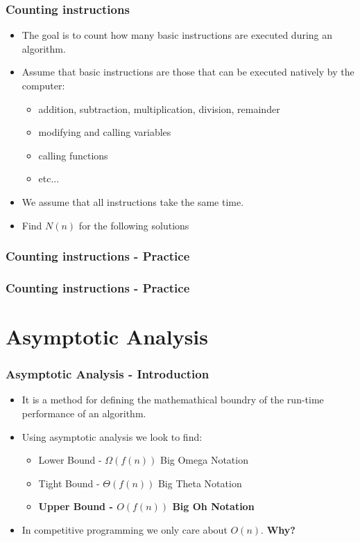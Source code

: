\documentclass{beamer}
\begin{document}
\begin{frame}
	\frametitle{Counting instructions}

	\begin{itemize}
		\item The goal is to count how many basic instructions are executed during an algorithm.
		\item Assume that basic instructions are those that can be executed natively by the computer:
			\begin{itemize}
				\item addition, subtraction, multiplication, division, remainder
				\item modifying and calling variables
				\item calling functions
				\item etc...
			\end{itemize}
		\item We assume that all instructions take the same time.
		\item Find $N(n)$ for the following solutions
	\end{itemize}
\end{frame}

\begin{frame}[fragile]
	\frametitle{Counting instructions - Practice}
	
\end{frame}

\begin{frame}[fragile]
	\frametitle{Counting instructions - Practice}
	
\end{frame}


\section{Asymptotic Analysis}

\begin{frame}
	\frametitle{Asymptotic Analysis - Introduction}

	\begin{itemize}
		\item It is a method for defining the mathemathical boundry of the run-time performance of an algorithm.
		\item Using asymptotic analysis we look to find:
			\begin{itemize}
				\item Lower Bound - $\Omega(f(n))$ Big Omega Notation
				\item Tight Bound - $\Theta(f(n))$ Big Theta Notation
				\item \textbf{Upper Bound - $O(f(n))$ Big Oh Notation}
			\end{itemize}
		\item In competitive programming we only care about $O(n)$. \textbf{Why?}
	\end{itemize}
\end{frame}
\end{document}
